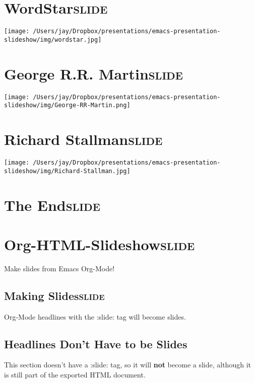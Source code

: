 \documentclass[11pt]{article}
\begin{document}
\section{WordStar\hfill{}\textsc{slide}}
\label{sec:orgheadline43}

\texttt{[image: /Users/jay/Dropbox/presentations/emacs-presentation-slideshow/img/wordstar.jpg]} 

\section{George R.R. Martin\hfill{}\textsc{slide}}
\label{sec:orgheadline44}
\texttt{[image: /Users/jay/Dropbox/presentations/emacs-presentation-slideshow/img/George-RR-Martin.png]} 

\section{Richard Stallman\hfill{}\textsc{slide}}
\label{sec:orgheadline45}
\texttt{[image: /Users/jay/Dropbox/presentations/emacs-presentation-slideshow/img/Richard-Stallman.jpg]} 

\section{The End\hfill{}\textsc{slide}}
\label{sec:orgheadline46}


\section{Org-HTML-Slideshow\hfill{}\textsc{slide}}
\label{sec:orgheadline59}

Make slides from Emacs Org-Mode!

\subsection{Making Slides\hfill{}\textsc{slide}}
\label{sec:orgheadline47}

Org-Mode headlines with the :slide: tag will become slides.

\subsection{Headlines Don't Have to be Slides}
\label{sec:orgheadline48}

This section doesn't have a :slide: tag, so it will \textbf{not} become a slide, although it is still part of the exported HTML document.
\end{document}
